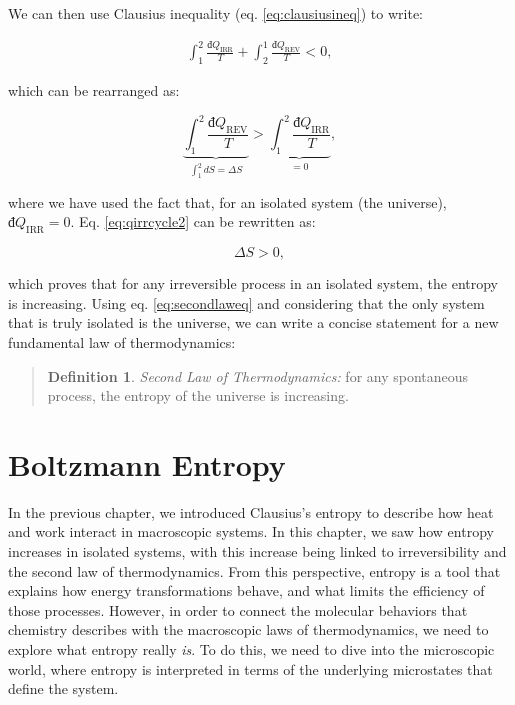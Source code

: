 \documentclass[
  9pt,
]{extbook}
\theoremstyle{definition}
\newtheorem{definition}{Definition}[chapter]
\theoremstyle{definition}
\theoremstyle{definition}
\theoremstyle{definition}
\theoremstyle{remark}
\begin{document}
We can then use Clausius inequality (eq. \eqref{eq:clausiusineq}) to write:

\begin{equation}
\begin{aligned}
\int_1^2 \frac{đQ_{\mathrm{IRR}}}{T} + \int_2^1 \frac{đQ_{\mathrm{REV}}}{T} < 0,
\end{aligned}
\label{eq:qirrcycle1}
\end{equation}

which can be rearranged as:

\begin{equation}
\underbrace{\int_1^2 \frac{đQ_{\mathrm{REV}}}{T}}_{\int_1^2 dS = \Delta S} > \underbrace{\int_1^2 \frac{đQ_{\mathrm{IRR}}}{T}}_{=0},
\label{eq:qirrcycle2}
\end{equation}

where we have used the fact that, for an isolated system (the universe), \(đQ_{\mathrm{IRR}}=0\). Eq. \eqref{eq:qirrcycle2} can be rewritten as:

\begin{equation}
\Delta S > 0,
\label{eq:secondlaweq}
\end{equation}

which proves that for any irreversible process in an isolated system, the entropy is increasing. Using eq. \eqref{eq:secondlaweq} and considering that the only system that is truly isolated is the universe, we can write a concise statement for a new fundamental law of thermodynamics:

\begin{quote}
\begin{definition}
\protect\hypertarget{def:secondlawdef}{}\label{def:secondlawdef}\emph{Second Law of Thermodynamics:} for any spontaneous process, the entropy of the universe is increasing.
\end{definition}
\end{quote}

\section{Boltzmann Entropy}\label{boltzmann-entropy}

In the previous chapter, we introduced Clausius's entropy to describe how heat and work interact in macroscopic systems. In this chapter, we saw how entropy increases in isolated systems, with this increase being linked to irreversibility and the second law of thermodynamics. From this perspective, entropy is a tool that explains how energy transformations behave, and what limits the efficiency of those processes. However, in order to connect the molecular behaviors that chemistry describes with the macroscopic laws of thermodynamics, we need to explore what entropy really \emph{is}. To do this, we need to dive into the microscopic world, where entropy is interpreted in terms of the underlying microstates that define the system.
\end{document}
